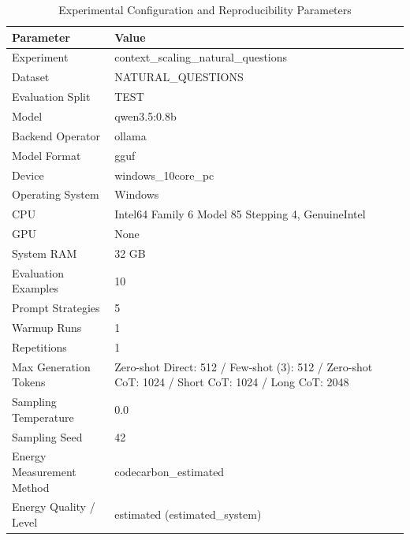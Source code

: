 \begin{table}
\caption{Experimental Configuration and Reproducibility Parameters}
\label{tab:experimental_configuration}
\begin{tabular}{ll}
\toprule
Parameter & Value \\
\midrule
Experiment & context\_scaling\_natural\_questions \\
Dataset & NATURAL\_QUESTIONS \\
Evaluation Split & TEST \\
Model & qwen3.5:0.8b \\
Backend Operator & ollama \\
Model Format & gguf \\
Device & windows\_10core\_pc \\
Operating System & Windows \\
CPU & Intel64 Family 6 Model 85 Stepping 4, GenuineIntel \\
GPU & None \\
System RAM & 32 GB \\
Evaluation Examples & 10 \\
Prompt Strategies & 5 \\
Warmup Runs & 1 \\
Repetitions & 1 \\
Max Generation Tokens & Zero-shot Direct: 512 / Few-shot (3): 512 / Zero-shot CoT: 1024 / Short CoT: 1024 / Long CoT: 2048 \\
Sampling Temperature & 0.0 \\
Sampling Seed & 42 \\
Energy Measurement Method & codecarbon\_estimated \\
Energy Quality / Level & estimated (estimated\_system) \\
\bottomrule
\end{tabular}
\end{table}
